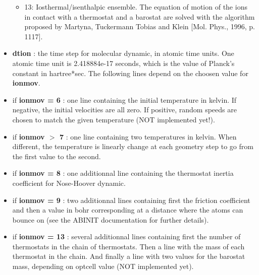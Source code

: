 \documentclass[a4paper,11pt]{report}
\begin{document}
\begin{itemize}
\begin{itemize}
                         \item 13: Iosthermal/isenthalpic ensemble. The equation of motion of the ions in contact with a thermostat and a barostat are solved with the algorithm proposed by Martyna, Tuckermann Tobias and Klein [Mol. Phys., 1996, p. 1117].
                         \end{itemize}
\item  \textbf{dtion} : the time step for molecular dynamic, in atomic time units. One atomic time unit is 2.418884e-17 seconds, which is the value of Planck's constant in hartree*sec. The following lines depend on the choosen value for \textbf{ionmov}.
\item  if \textbf{ionmov = 6} : one line containing the initial temperature in kelvin. If negative, the initial velocities are all zero. If positive, random speeds are chosen to match the given temperature (NOT implemented yet!).
\item  if \textbf{ionmov $>$ 7} : one line containing two temperatures in kelvin. When different, the temperature is linearly change at each geometry step to go from the first value to the second.
\item  if \textbf{ionmov = 8} : one additionnal line containing the thermostat inertia coefficient for Nose-Hoover dynamic.
\item  if \textbf{ionmov = 9} : two additionnal lines containing first the friction coefficient and then a value in bohr corresponding at a distance where the atoms can bounce on (see the ABINIT documentation for further details).
\item  if \textbf{ionmov = 13} : several additionnal lines containing first the number of thermostats in the chain of thermostats. Then a line with the mass of each thermostat in the chain. And finally a line with two values for the barostat mass, depending on optcell value (NOT implemented yet).


\end{itemize}
\end{document}
